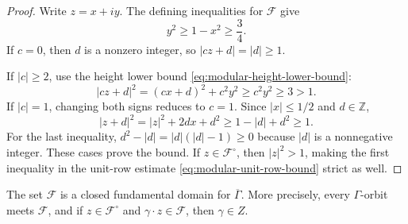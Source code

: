 \begin{proof}
Write $z=x+iy$. The defining inequalities for $\mathcal F$ give
\begin{equation}\label{eq:modular-height-lower-bound}
 y^2\geq1-x^2\geq\frac34.
\end{equation}
If $c=0$, then $d$ is a nonzero integer, so $|cz+d|=|d|\geq1$.

If $|c|\geq2$, use the height lower bound \eqref{eq:modular-height-lower-bound}:
\[
 |cz+d|^2=(cx+d)^2+c^2y^2\geq c^2y^2\geq3>1.
\]
If $|c|=1$, changing both signs reduces to $c=1$. Since $|x|\leq1/2$ and $d\in\mathbb Z$,
\begin{equation}\label{eq:modular-unit-row-bound}
 |z+d|^2=|z|^2+2dx+d^2\geq1-|d|+d^2\geq1.
\end{equation}
For the last inequality, $d^2-|d|=|d|(|d|-1)\geq0$ because $|d|$ is a nonnegative integer. These cases prove the bound. If $z\in\mathcal F^\circ$, then $|z|^2>1$, making the first inequality in the unit-row estimate \eqref{eq:modular-unit-row-bound} strict as well.
\end{proof}

\begin{theorem}\label{modular.fundamental-domain}
The set $\mathcal F$ is a closed fundamental domain for $\overline\Gamma$. More precisely, every $\Gamma$-orbit meets $\mathcal F$, and if $z\in\mathcal F^\circ$ and $\gamma\cdot z\in\mathcal F$, then $\gamma\in Z$.
\end{theorem}

